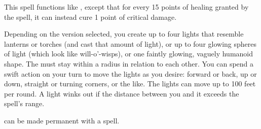 \begin{spelleffect}
  This spell functions like , except that for every 15 points of healing granted by the spell, it can instead cure 1 point of critical damage.
\end{spelleffect}

\begin{comment}
\subsubsection{D}
\end{comment}

\spellrng{\rngmed}
\begin{spelleffect}
  Depending on the version selected, you create up to four lights that resemble lanterns or torches (and cast that amount of light), or up to four glowing spheres of light (which look like will-o'-wisps), or one faintly glowing, vaguely humanoid shape. The  must stay within a \areasmall radius in relation to each other. You can spend a swift action on your turn to move the lights as you desire: forward or back, up or down, straight or turning corners, or the like. The lights can move up to 100 feet per round. A light winks out if the distance between you and it exceeds the spell's range.
\end{spelleffect}
\begin{spellnotes}
   can be made permanent with a  spell.
\end{spellnotes}

